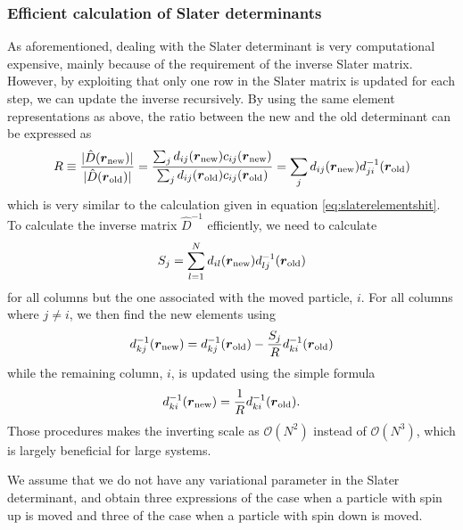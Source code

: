 \subsubsection{Efficient calculation of Slater determinants} \label{sec:efficientcalculationsofslaterdeterminant}
As aforementioned, dealing with the Slater determinant is very computational expensive, mainly because of the requirement of the inverse Slater matrix. However, by exploiting that only one row in the Slater matrix is updated for each step, we can update the inverse recursively. By using the same element representations as above, the ratio between the new and the old determinant can be expressed as
\begin{equation}
R\equiv \frac{|\hat{D}(\boldsymbol{{r}}_{\text{new}})|}{|\hat{D}(\boldsymbol{{r}}_{\text{old}})|}=\frac{\sum_{j}d_{ij}(\boldsymbol{{r}}_{\text{new}})c_{ij}(\boldsymbol{{r}}_{\text{new}})}{\sum_{j}d_{ij}(\boldsymbol{{r}}_{\text{old}})c_{ij}(\boldsymbol{{r}}_{\text{old}})}=\sum_{j}d_{ij}(\boldsymbol{{r}}_{\text{new}})d_{ji}^{-1}(\boldsymbol{{r}}_{\text{old}})
\label{eq:slaterratio}
\end{equation}
which is very similar to the calculation given in equation \eqref{eq:slaterelementshit}. To calculate the inverse matrix $\hat{D}^{-1}$ efficiently, we need to calculate
\begin{equation}
S_j=\sum_{l=1}^Nd_{il}(\boldsymbol{{r}}_{\text{new}})d_{lj}^{-1}(\boldsymbol{{r}}_{\text{old}})
\label{eq:slaters}
\end{equation}
for all columns but the one associated with the moved particle, $i$. For all columns where $j\neq i$, we then find the new elements using
\begin{equation}
d_{kj}^{-1}(\boldsymbol{{r}}_{\text{new}})=d_{kj}^{-1}(\boldsymbol{{r}}_{\text{old}})-\frac{S_j}{R}d_{ki}^{-1}(\boldsymbol{{r}}_{\text{old}})
\label{eq:slaterinverse}
\end{equation}
while the remaining column, $i$, is updated using the simple formula \cite{morten_hjorth-jensen_computational_2019}
\begin{equation}
d_{ki}^{-1}(\boldsymbol{{r}}_{\text{new}})=\frac{1}{R}d_{ki}^{-1}(\boldsymbol{{r}}_{\text{old}}).
\label{eq:slaterinverse2}
\end{equation}
Those procedures makes the inverting scale as $\mathcal{O}(N^2)$ instead of $\mathcal{O}(N^3)$, which is largely beneficial for large systems.

We assume that we do not have any variational parameter in the Slater determinant, and obtain three expressions of the case when a particle with spin up is moved and three of the case when a particle with spin down is moved. 

